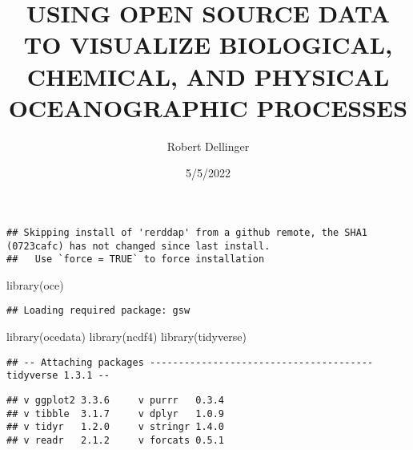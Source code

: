 \documentclass[]{tufte-handout}
\title{USING OPEN SOURCE DATA TO VISUALIZE BIOLOGICAL, CHEMICAL, AND
PHYSICAL OCEANOGRAPHIC PROCESSES}
\author{Robert Dellinger}
\date{5/5/2022}
\newenvironment{Shaded}{}{}
\newcommand{\AttributeTok}[1]{\textcolor[rgb]{0.49,0.56,0.16}{#1}}
\newcommand{\ConstantTok}[1]{\textcolor[rgb]{0.53,0.00,0.00}{#1}}
\newcommand{\FunctionTok}[1]{\textcolor[rgb]{0.02,0.16,0.49}{#1}}
\newcommand{\NormalTok}[1]{#1}
\newcommand{\SpecialCharTok}[1]{\textcolor[rgb]{0.25,0.44,0.63}{#1}}
\newcommand{\StringTok}[1]{\textcolor[rgb]{0.25,0.44,0.63}{#1}}
\begin{document}
\maketitle




\begin{Shaded}
\end{Shaded}

\begin{verbatim}
## Skipping install of 'rerddap' from a github remote, the SHA1 (0723cafc) has not changed since last install.
##   Use `force = TRUE` to force installation
\end{verbatim}

\begin{Shaded}
\begin{Highlighting}[]
\FunctionTok{library}\NormalTok{(oce)}
\end{Highlighting}
\end{Shaded}

\begin{verbatim}
## Loading required package: gsw
\end{verbatim}

\begin{Shaded}
\begin{Highlighting}[]
\FunctionTok{library}\NormalTok{(ocedata)}
\FunctionTok{library}\NormalTok{(ncdf4)}
\FunctionTok{library}\NormalTok{(tidyverse)}
\end{Highlighting}
\end{Shaded}

\begin{verbatim}
## -- Attaching packages --------------------------------------- tidyverse 1.3.1 --
\end{verbatim}

\begin{verbatim}
## v ggplot2 3.3.6     v purrr   0.3.4
## v tibble  3.1.7     v dplyr   1.0.9
## v tidyr   1.2.0     v stringr 1.4.0
## v readr   2.1.2     v forcats 0.5.1
\end{verbatim}
\end{document}
